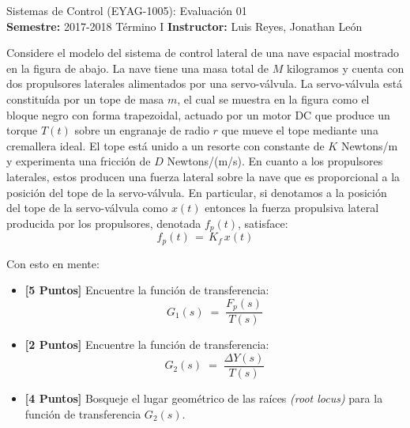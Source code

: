 \documentclass[ a4paper, twoside, 11pt]{article}
\newcommand{\numero}{01}
\begin{document}
\allowdisplaybreaks

\begin{center}
\Large Sistemas de Control (EYAG-1005): Evaluaci\'on \numero \\[1ex]
\small \textbf{Semestre:} 2017-2018 T\'ermino I \qquad
\textbf{Instructor:} Luis Reyes, Jonathan Le\'on
\end{center}
\halfskip



\begin{problem}
Considere el modelo del sistema de control lateral de una nave espacial mostrado en la figura de abajo. La nave tiene una masa total de $M$ kilogramos y cuenta con dos propulsores laterales alimentados por una servo-v\'alvula. La servo-v\'alvula est\'a constitu\'ida por un tope de masa $m$, el cual se muestra en la figura como el bloque negro con forma trapezoidal, actuado por un motor DC que produce un torque $T(t)$ sobre un engranaje de radio $r$ que mueve el tope mediante una cremallera ideal. El tope est\'a unido a un resorte con constante de $K$ Newtons/m y experimenta una fricci\'on de $D$ Newtons/(m/s). En cuanto a los propulsores laterales, estos producen una fuerza lateral sobre la nave que es proporcional a la posici\'on del tope de la servo-v\'alvula. En particular, si denotamos a la posici\'on del tope de la servo-v\'alvula como $x(t)$ entonces la fuerza propulsiva lateral producida por los propulsores, denotada $f_p(t)$, satisface: 
\[
f_p(t) \, = \, K_f \, x(t)
\]
\begin{figure}[htb]
\centering
\def\svgwidth{\columnwidth}

\end{figure}

Con esto en mente: 
\begin{itemize}
\item \textbf{[5 Puntos]} Encuentre la funci\'on de transferencia: 
\[
G_1(s) \; = \; \frac{F_p(s)}{T(s)}
\]
\item \textbf{[2 Puntos]} Encuentre la funci\'on de transferencia: 
\[
G_2(s) \; = \; \frac{\Delta Y(s)}{T(s)}
\]
\item \textbf{[4 Puntos]} Bosqueje el lugar geom\'etrico de las ra\'ices \emph{(root locus)} para la funci\'on de transferencia $G_2(s)$. 

\end{itemize}

\end{problem}
\vspace{\baselineskip}
\end{document}

